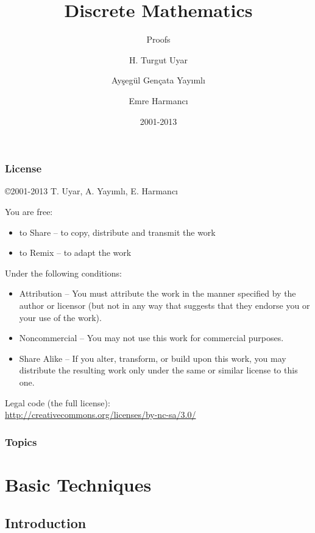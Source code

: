 \documentclass[dvipsnames]{beamer}
\title{Discrete Mathematics}
\subtitle{Proofs}
\author{H. Turgut Uyar \and Ayşegül Gençata Yayımlı \and Emre Harmancı}
\date{2001-2013}
\begin{document}
\begin{frame}
  \titlepage
\end{frame}

\begin{frame}
  \frametitle{License}

  \hfill
  \copyright 2001-2013 T. Uyar, A. Yayımlı, E. Harmancı

  \vfill
  \begin{tiny}
    You are free:
    \begin{itemize}
      \item to Share -- to copy, distribute and transmit the work
      \item to Remix -- to adapt the work
    \end{itemize}

    Under the following conditions:
    \begin{itemize}
      \item Attribution -- You must attribute the work in the manner specified by
        the author or licensor (but not in any way that suggests that they
        endorse you or your use of the work).

      \item Noncommercial -- You may not use this work for commercial purposes.

      \item Share Alike -- If you alter, transform, or build upon this work, you
        may distribute the resulting work only under the same or similar license
        to this one.
    \end{itemize}
  \end{tiny}

  \vfill
  Legal code (the full license):\\
  \url{http://creativecommons.org/licenses/by-nc-sa/3.0/}
\end{frame}

\begin{frame}
  \frametitle{Topics}
  \tableofcontents
\end{frame}

\section{Basic Techniques}

\subsection{Introduction}
\end{document}
